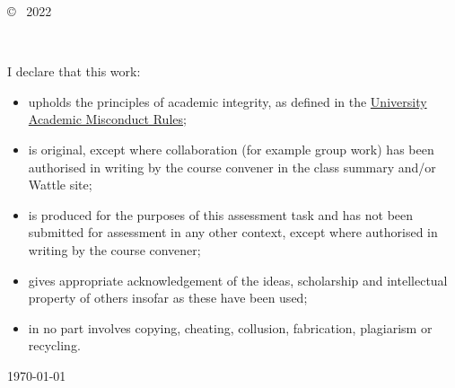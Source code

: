 \vspace*{14cm}
\begin{center}
  \makeatletter
  \copyright\ \@author{} 2022
  \makeatother
\end{center}
\noindent
\begin{center}
  \footnotesize{~} %
\end{center}
\noindent

\newpage

\vspace*{4cm}
I declare that this work:\\
\begin{itemize}
  \item[] upholds the principles of academic integrity, as defined in the \href{https://www.anu.edu.au/about/governance/legislation}{University Academic Misconduct Rules};
  \item[] is original, except where collaboration (for example group work) has been authorised in writing by the course convener in the class summary and/or Wattle site;
  \item[] is produced for the purposes of this assessment task and has not been submitted for assessment in any other context, except where authorised in writing by the course convener;
  \item[] gives appropriate acknowledgement of the ideas, scholarship and intellectual property of others insofar as these have been used;
  \item[] in no part involves copying, cheating, collusion, fabrication, plagiarism or recycling.
\end{itemize}

\vspace*{2cm}

\hspace{10cm}\makeatletter\@author\makeatother\par
\hspace{10cm}\today
